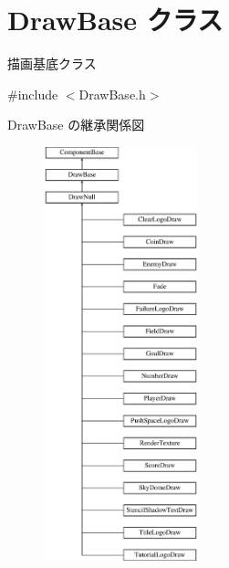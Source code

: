\hypertarget{class_draw_base}{}\section{Draw\+Base クラス}
\label{class_draw_base}


描画基底クラス  




{\ttfamily \#include $<$Draw\+Base.\+h$>$}

Draw\+Base の継承関係図\begin{figure}[H]
\begin{center}
\leavevmode
\includegraphics[height=12.000000cm]{class_draw_base}
\end{center}
\end{figure}
